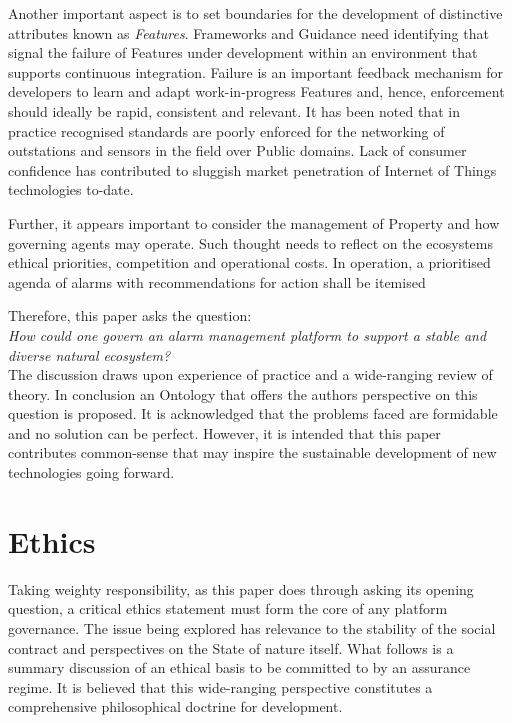 \documentclass[11pt, oneside]{book}   	%
\begin{document}
Another important aspect is to set boundaries for the development of distinctive attributes known as \emph{Features}.
Frameworks and Guidance need identifying that signal the failure of Features under development within an environment that supports continuous integration.
Failure is an important feedback mechanism for developers to learn and adapt work-in-progress Features and, hence, enforcement should ideally be rapid, consistent and relevant.
It has been noted that in practice recognised standards are poorly enforced for the networking of outstations and sensors in the field over Public domains.
Lack of consumer confidence has contributed to sluggish market penetration of Internet of Things technologies to-date.\

Further, it appears important to consider the management of Property and how governing agents may operate.
Such thought needs to reflect on the ecosystems ethical priorities, competition and operational costs.
In operation, a prioritised agenda of alarms with recommendations for action shall be itemised\

Therefore, this paper asks the question:\\

\emph{How could one govern an alarm management platform to support a stable and diverse natural ecosystem?}\\

The discussion draws upon experience of practice and a wide-ranging review of theory.
In conclusion an Ontology that offers the authors perspective on this question is proposed.
It is acknowledged that the problems faced are formidable and no solution can be perfect.
However, it is intended that this paper contributes common-sense that may inspire the sustainable development of new technologies going forward.\

\newpage
\thispagestyle{empty}
\mbox{}
\newpage

\chapter{Ethics}
Taking weighty responsibility, as this paper does through asking its opening question, a critical ethics statement must form the core of any platform governance.
The issue being explored has relevance to the stability of the social contract and perspectives on the State of nature itself.
What follows is a summary discussion of an ethical basis to be committed to by an assurance regime.
It is believed that this wide-ranging perspective constitutes a comprehensive philosophical doctrine for development.
\end{document}
